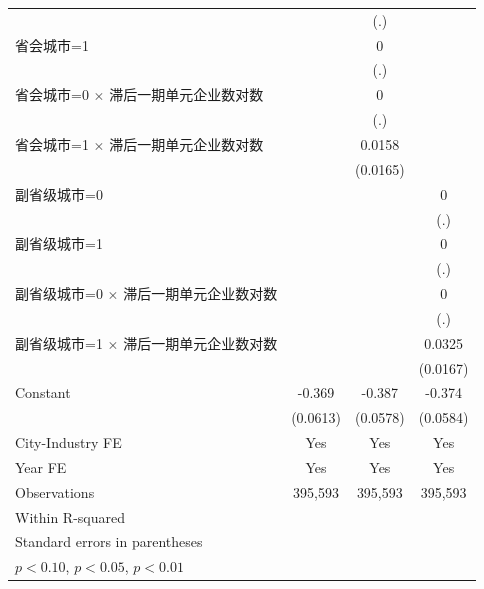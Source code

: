 \begin{table}[htbp]
\begin{tabular}{l*{3}{c}}
                    &                     &         (.)         &                     \\
\addlinespace
省会城市=1          &                     &           0         &                     \\
                    &                     &         (.)         &                     \\
\addlinespace
省会城市=0 $\times$ 滞后一期单元企业数对数&                     &           0         &                     \\
                    &                     &         (.)         &                     \\
\addlinespace
省会城市=1 $\times$ 滞后一期单元企业数对数&                     &      0.0158         &                     \\
                    &                     &    (0.0165)         &                     \\
\addlinespace
副省级城市=0        &                     &                     &           0         \\
                    &                     &                     &         (.)         \\
\addlinespace
副省级城市=1        &                     &                     &           0         \\
                    &                     &                     &         (.)         \\
\addlinespace
副省级城市=0 $\times$ 滞后一期单元企业数对数&                     &                     &           0         \\
                    &                     &                     &         (.)         \\
\addlinespace
副省级城市=1 $\times$ 滞后一期单元企业数对数&                     &                     &      0.0325\sym{*}  \\
                    &                     &                     &    (0.0167)         \\
\addlinespace
Constant            &      -0.369\sym{***}&      -0.387\sym{***}&      -0.374\sym{***}\\
                    &    (0.0613)         &    (0.0578)         &    (0.0584)         \\
\midrule
City-Industry FE    &         Yes         &         Yes         &         Yes         \\
Year FE             &         Yes         &         Yes         &         Yes         \\
Observations        &     395,593         &     395,593         &     395,593         \\
Within R-squared    &                     &                     &                     \\
\bottomrule
\multicolumn{4}{l}{\footnotesize Standard errors in parentheses}\\
\multicolumn{4}{l}{\footnotesize \sym{*} \(p<0.10\), \sym{**} \(p<0.05\), \sym{***} \(p<0.01\)}\\
\end{tabular}
\end{table}
